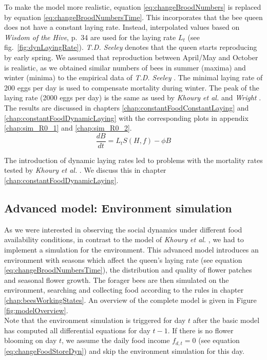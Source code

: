 		To make the model more realistic, equation \ref{eq:changeBroodNumbers} is replaced by equation \ref{eq:changeBroodNumbersTime}. This incorporates that the bee queen does not have a constant laying rate. Instead, interpolated values based on \textit{Wisdom of the Hive}, p.~34 \cite{seeley95} are used for the laying rate $L_t$ (see fig.~\ref{fig:dynLayingRate}). \textit{T.D. Seeley} denotes that the queen starts reproducing by early spring. We assumed that reproduction between April/May and October is realistic, as we obtained similar numbers of bees in summer (maxima) and winter (minima) to the empirical data of \textit{T.D. Seeley} \cite{seeley95}. The minimal laying rate of 200 eggs per day is used to compensate mortality during winter. The peak of the laying rate (2000 eggs per day) is the same as used by \textit{Khoury et al.} \cite{khoury13} and \textit{Wright} \cite{wright08}. The results are discussed in chapters \ref{chap:constantFoodConstantLaying} and \ref{chap:constantFoodDynamicLaying} with the corresponding plots in appendix \ref{chap:sim_R0_1} and \ref{chap:sim_R0_2}.		
		\begin{equation}\label{eq:changeBroodNumbersTime}
			\frac{dB}{dt} = L_tS(H,f)-\phi B
		\end{equation}
		
		The introduction of dynamic laying rates led to problems with the mortality rates tested by \textit{Khoury et al.} \cite{khoury13}. We discuss this in chapter \ref{chap:constantFoodDynamicLaying}.
	
	\subsection{Advanced model: Environment simulation}
		\label{chap:advancedModel}
		

		As we were interested in observing the social dynamics under different food availability conditions, in contrast to the model of \textit{Khoury et al.} \cite{khoury13}, we had to implement a simulation for the environment. This advanced model introduces an environment with seasons which affect the queen's laying rate (see equation \ref{eq:changeBroodNumbersTime}), the distribution and quality of flower patches and seasonal flower growth.
		The forager bees are then simulated on the environment, searching and collecting food according to the rules in chapter \ref{chap:beesWorkingStates}. An overview of the complete model is given in Figure \ref{fig:modelOverview}.\\
		 Note that the environment simulation is triggered for day $t$ after the basic model has computed all differential equations for day $t-1$. If there is no flower blooming on day $t$, we assume the daily food income $f_{d,t} = 0$ (see equation \ref{eq:changeFoodStoreDyn}) and skip the environment simulation for this day.
		

